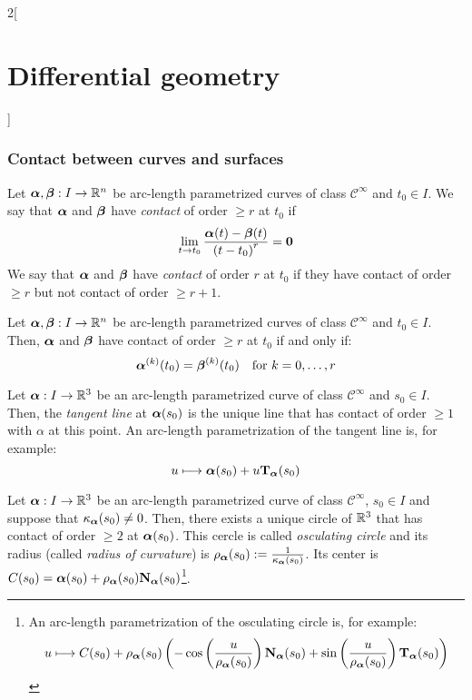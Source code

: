 \documentclass[../../../main.tex]{subfiles}
\begin{document}
\begin{multicols}{2}[\section{Differential geometry}]
  \subsubsection{Contact between curves and surfaces}
  \begin{definition}
    Let $\boldsymbol{\mathrm{\alpha}},\boldsymbol{\mathrm{\beta}}:I\rightarrow\mathbb{R}^n$ be arc-length parametrized curves of class $\mathcal{C}^\infty$ and $t_0\in I$. We say that $\boldsymbol{\mathrm{\alpha}}$ and $\boldsymbol{\mathrm{\beta}}$ have \emph{contact} of order $\geq r$ at $t_0$ if $$\lim_{t\to t_0}\frac{\boldsymbol{\mathrm{\alpha}}(t)-\boldsymbol{\mathrm{\beta}}(t)}{{(t-t_0)}^r}=\boldsymbol{\mathrm{0}}$$
    We say that $\boldsymbol{\mathrm{\alpha}}$ and $\boldsymbol{\mathrm{\beta}}$ have \emph{contact} of order $r$ at $t_0$ if they have contact of order $\geq r$ but not contact of order $\geq r+1$.
  \end{definition}
  \begin{proposition}
    Let $\boldsymbol{\mathrm{\alpha}},\boldsymbol{\mathrm{\beta}}:I\rightarrow\mathbb{R}^n$ be arc-length parametrized curves of class $\mathcal{C}^\infty$ and $t_0\in I$. Then, $\boldsymbol{\mathrm{\alpha}}$ and $\boldsymbol{\mathrm{\beta}}$ have contact of order $\geq r$ at $t_0$ if and only if: $$\boldsymbol{\mathrm{\alpha}}^{(k)}(t_0)=\boldsymbol{\mathrm{\beta}}^{(k)}(t_0)\quad\text{for }k=0,\ldots,r$$
  \end{proposition}
  \begin{proposition}
    Let $\boldsymbol{\mathrm{\alpha}}:I\rightarrow\mathbb{R}^3$ be an arc-length parametrized curve of class $\mathcal{C}^\infty$ and $s_0\in I$. Then, the \emph{tangent line} at $\boldsymbol{\mathrm{\alpha}}(s_0)$ is the unique line that has contact of order $\geq 1$ with $\alpha$ at this point. An arc-length parametrization of the tangent line is, for example: $$u\longmapsto \boldsymbol{\mathrm{\alpha}}(s_0)+u{\boldsymbol{\mathrm{T}}_{\boldsymbol{\mathrm{\alpha}}}}(s_0)$$
  \end{proposition}
  \begin{proposition}
    Let $\boldsymbol{\mathrm{\alpha}}:I\rightarrow\mathbb{R}^3$ be an arc-length parametrized curve of class $\mathcal{C}^\infty$, $s_0\in I$ and suppose that ${\kappa_{\boldsymbol{\mathrm{\alpha}}}}(s_0)\ne 0$. Then, there exists a unique circle of $\mathbb{R}^3$ that has contact of order $\geq 2$ at $\boldsymbol{\mathrm{\alpha}}(s_0)$. This cercle is called \emph{osculating circle} and its radius (called \emph{radius of curvature}) is $\rho_{\boldsymbol{\mathrm{\alpha}}}(s_0):=\frac{1}{{\kappa_{\boldsymbol{\mathrm{\alpha}}}}(s_0)}$. Its center is $C(s_0)=\boldsymbol{\mathrm{\alpha}}(s_0)+\rho_{\boldsymbol{\mathrm{\alpha}}}(s_0){\boldsymbol{\mathrm{N}}_{\boldsymbol{\mathrm{\alpha}}}}(s_0)$\footnote{An arc-length parametrization of the osculating circle is, for example: $$u\longmapsto C(s_0)+\rho_{\boldsymbol{\mathrm{\alpha}}}(s_0)\left(-\cos\left(\frac{u}{\rho_{\boldsymbol{\mathrm{\alpha}}}(s_0)}\right){\boldsymbol{\mathrm{N}}_{\boldsymbol{\mathrm{\alpha}}}}(s_0)+\sin\left(\frac{u}{\rho_{\boldsymbol{\mathrm{\alpha}}}(s_0)}\right){\boldsymbol{\mathrm{T}}_{\boldsymbol{\mathrm{\alpha}}}}(s_0)\right)$$}.
  \end{proposition}

\end{multicols}
\end{document}
